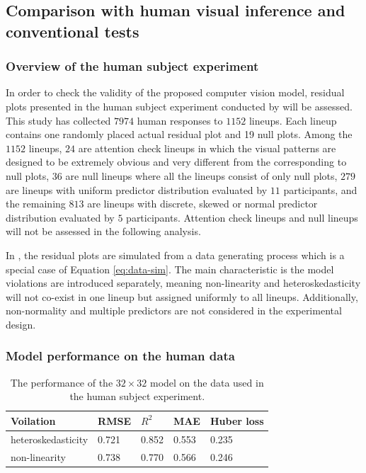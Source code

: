 \documentclass[]{interact}
\theoremstyle{plain}%
\theoremstyle{definition}
\theoremstyle{remark}
\begin{document}
\subsection{Comparison with human visual inference and conventional
tests}\label{comparison-with-human-visual-inference-and-conventional-tests}

\subsubsection{Overview of the human subject
experiment}\label{overview-of-the-human-subject-experiment}

In order to check the validity of the proposed computer vision model,
residual plots presented in the human subject experiment conducted by
\citet{li2023plot} will be assessed. This study has collected \(7974\)
human responses to \(1152\) lineups. Each lineup contains one randomly
placed actual residual plot and 19 null plots. Among the \(1152\)
lineups, \(24\) are attention check lineups in which the visual patterns
are designed to be extremely obvious and very different from the
corresponding to null plots, \(36\) are null lineups where all the
lineups consist of only null plots, \(279\) are lineups with uniform
predictor distribution evaluated by \(11\) participants, and the
remaining \(813\) are lineups with discrete, skewed or normal predictor
distribution evaluated by \(5\) participants. Attention check lineups
and null lineups will not be assessed in the following analysis.

In \citet{li2023plot}, the residual plots are simulated from a data
generating process which is a special case of Equation
\ref{eq:data-sim}. The main characteristic is the model violations are
introduced separately, meaning non-linearity and heteroskedasticity will
not co-exist in one lineup but assigned uniformly to all lineups.
Additionally, non-normality and multiple predictors are not considered
in the experimental design.

\subsubsection{Model performance on the human
data}\label{model-performance-on-the-human-data}

\begin{table}

\caption{\label{tab:experiment-performance}The performance of the $32 \times 32$ model on the data used in the human subject experiment.}
\centering
\begin{tabular}[t]{lllll}
\toprule
Voilation & RMSE & $R^2$ & MAE & Huber loss\\
\midrule
heteroskedasticity & 0.721 & 0.852 & 0.553 & 0.235\\
non-linearity & 0.738 & 0.770 & 0.566 & 0.246\\
\bottomrule
\end{tabular}
\end{table}
\end{document}
